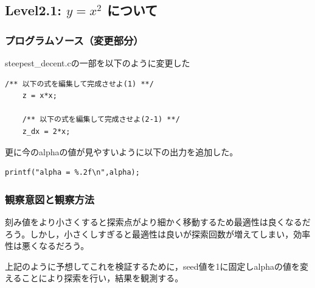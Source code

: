\subsection{Level2.1: $y=x^2$ について}
\subsubsection{プログラムソース（変更部分）}
steepest\_decent.cの一部を以下のように変更した
\begin{lstlisting}[basicstyle=\ttfamily\footnotesize, frame=single]
    /** 以下の式を編集して完成させよ(1) **/
    z = x*x;

    /** 以下の式を編集して完成させよ(2-1) **/
    z_dx = 2*x;
\end{lstlisting}
更に今のalphaの値が見やすいように以下の出力を追加した。
\begin{lstlisting}[basicstyle=\ttfamily\footnotesize, frame=single] 
     printf("alpha = %.2f\n",alpha);
\end{lstlisting}
\subsubsection{観察意図と観察方法}
刻み値をより小さくすると探索点がより細かく移動するため最適性は良くなるだろう。しかし，小さくしすぎると最適性は良いが探索回数が増えてしまい，効率性は悪くなるだろう。

上記のように予想してこれを検証するために，seed値を1に固定しalphaの値を変えることにより探索を行い，結果を観測する。
